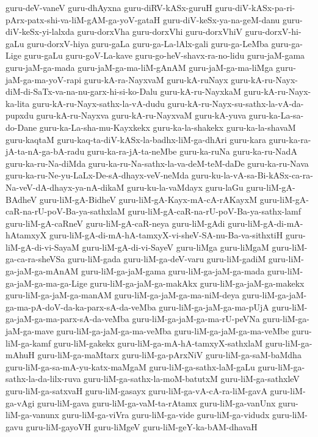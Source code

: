 {guru-deV-vaneV
guru-dhAyxna
guru-diRV-kASx-guruH
guru-diV-kASx-pa-ri-pArx-patx-shi-va-liM-gAM-ga-yoV-gataH
guru-diV-keSx-ya-na-geM-danu
guru-diV-keSx-yi-lalxda
guru-dorxVha
guru-dorxVhi
guru-dorxVhiV
guru-dorxV-hi-gaLu
guru-dorxV-hiya
guru-gaLa
guru-ga-La-lAlx-gali
guru-ga-LeMba
guru-ga-Lige
guru-gaLu
guru-goV-La-kave
guru-go-heV-shavx-ra-no-lidu
guru-jaM-gama
guru-jaM-ga-mada
guru-jaM-ga-ma-liM-gAnAM
guru-jaM-ga-ma-liMga
guru-jaM-ga-ma-yoV-rapi
guru-kA-ra-NayxvaM
guru-kA-ruNayx
guru-kA-ru-Nayx-diM-di-SaTx-va-na-nu-garx-hi-si-ko-Dalu
guru-kA-ru-NayxkaM
guru-kA-ru-Nayx-ka-lita
guru-kA-ru-Nayx-sathx-la-vA-dudu
guru-kA-ru-Nayx-su-sathx-la-vA-da-pupxdu
guru-kA-ru-Nayxva
guru-kA-ru-NayxvaM
guru-kA-yuva
guru-ka-La-sa-do-Dane
guru-ka-La-sha-mu-Kayxkekx
guru-ka-la-shakekx
guru-ka-la-shavaM
guru-kaqtaM
guru-kaq-ta-diV-kASx-la-badhx-liM-ga-dhAri
guru-kara
guru-ka-ra-jA-ta-nA-ga-bA-radu
guru-ka-ra-jA-ta-neMbe
guru-ka-ruNa
guru-ka-ru-NadA
guru-ka-ru-Na-diMda
guru-ka-ru-Na-sathx-la-va-deM-teM-daDe
guru-ka-ru-Nava
guru-ka-ru-Ne-yu-LaLx-De-sA-dhayx-veV-neMda
guru-ku-la-vA-sa-Bi-kASx-ca-ra-Na-veV-dA-dhayx-ya-nA-dikaM
guru-ku-la-vaMdayx
guru-laGu
guru-liM-gA-BAdheV
guru-liM-gA-BidheV
guru-liM-gA-Kayx-mA-cA-rAKayxM
guru-liM-gA-caR-na-rU-poV-Ba-ya-sathxlaM
guru-liM-gA-caR-na-rU-poV-Ba-ya-sathx-lamf
guru-liM-gA-caRneV
guru-liM-gA-caR-neya
guru-liM-gAdi
guru-liM-gA-di-mA-hAtamxyX
guru-liM-gA-di-mA-hA-tamxyX-vi-sheV-SA-nu-Ba-va-sithxtiH
guru-liM-gA-di-vi-SayaM
guru-liM-gA-di-vi-SayeV
guru-liMga
guru-liMgaM
guru-liM-ga-ca-ra-sheVSa
guru-liM-gada
guru-liM-ga-deV-varu
guru-liM-gadiM
guru-liM-ga-jaM-ga-mAnAM
guru-liM-ga-jaM-gama
guru-liM-ga-jaM-ga-mada
guru-liM-ga-jaM-ga-ma-ga-Lige
guru-liM-ga-jaM-ga-makAkx
guru-liM-ga-jaM-ga-makekx
guru-liM-ga-jaM-ga-manAM
guru-liM-ga-jaM-ga-ma-niM-deya
guru-liM-ga-jaM-ga-ma-pA-doV-da-ka-parx-sA-da-veMba
guru-liM-ga-jaM-ga-ma-pUjA
guru-liM-ga-jaM-ga-ma-parx-sA-da-veMba
guru-liM-ga-jaM-ga-ma-rU-peVNa
guru-liM-ga-jaM-ga-mave
guru-liM-ga-jaM-ga-ma-veMba
guru-liM-ga-jaM-ga-ma-veMbe
guru-liM-ga-kamf
guru-liM-gakekx
guru-liM-ga-mA-hA-tamxyX-sathxlaM
guru-liM-ga-mAhuH
guru-liM-ga-maMtarx
guru-liM-ga-pArxNiV
guru-liM-ga-saM-baMdha
guru-liM-ga-sa-mA-yu-katx-maMgaM
guru-liM-ga-sathx-laM-gaLu
guru-liM-ga-sathx-la-da-lilx-ruva
guru-liM-ga-sathx-la-moM-batutxM
guru-liM-ga-sathxleV
guru-liM-ga-satxvaH
guru-liM-gasayx
guru-liM-ga-vA-cA-ra-liM-gavA
guru-liM-ga-vAgi
guru-liM-gava
guru-liM-ga-vaM-ta-rAtamx
guru-liM-ga-vanUnx
guru-liM-ga-vanunx
guru-liM-ga-viVra
guru-liM-ga-vide
guru-liM-ga-vidudx
guru-liM-gavu
guru-liM-gayoVH
guru-liMgeV
guru-liM-geY-ka-bAM-dhavaH
}
